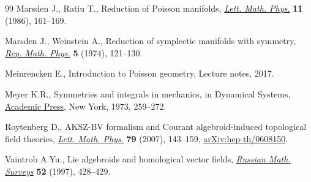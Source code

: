 \documentclass[pdftex]{sigma}
\numberwithin{equation}{section}
\begin{document}
\begin{thebibliography}{99}
Marsden J., Ratiu T., Reduction of {P}oisson manifolds, \href{https://doi.org/10.1007/BF00398428}{\textit{Lett. Math.
 Phys.}} \textbf{11} (1986), 161--169.

Marsden J., Weinstein A., Reduction of symplectic manifolds with symmetry,
 \href{https://doi.org/10.1016/0034-4877(74)90021-4}{\textit{Rep. Math. Phys.}} \textbf{5} (1974), 121--130.

Meinrencken E., Introduction to {P}oisson geometry, {L}ecture notes, 2017.

Meyer K.R., Symmetries and integrals in mechanics, in Dynamical {S}ystems,
 \href{https://doi.org/10.1016/B978-0-12-550350-1.50025-4}{Academic Press}, New York, 1973, 259--272.

Roytenberg D., A{KSZ}-{BV} formalism and {C}ourant algebroid-induced
 topological field theories, \href{https://doi.org/10.1007/s11005-006-0134-y}{\textit{Lett. Math. Phys.}} \textbf{79} (2007),
 143--159, \href{https://arxiv.org/abs/hep-th/0608150}{arXiv:hep-th/0608150}.

Vaintrob A.Yu., Lie algebroids and homological vector fields, \href{https://doi.org/10.1070/RM1997v052n02ABEH001802}{\textit{Russian
 Math. Surveys}} \textbf{52} (1997), 428--429.

\end{thebibliography}\LastPageEnding
\end{document}

